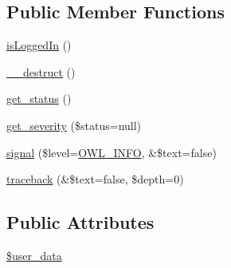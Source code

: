 \subsection*{Public Member Functions}
\begin{DoxyCompactItemize}
\item 
\hyperlink{classUserHandler_a4539c12ed2ce12a9147d61496854d5ab}{isLoggedIn} ()
\item 
\hyperlink{classUserHandler_a3e1f6381ed79caf6e1a255fb0a9cc386}{\_\-\_\-destruct} ()
\item 
\hyperlink{class__OWL_a99ec771fa2c5c279f80152cc09e489a8}{get\_\-status} ()
\item 
\hyperlink{class__OWL_adf9509ef96858be7bdd9414c5ef129aa}{get\_\-severity} (\$status=null)
\item 
\hyperlink{class__OWL_a51ba4a16409acf2a2f61f286939091a5}{signal} (\$level=\hyperlink{owl_8severitycodes_8php_a139328861128689f2f4def6a399d9057}{OWL\_\-INFO}, \&\$text=false)
\item 
\hyperlink{class__OWL_aa29547995d6741b7d2b90c1d4ea99a13}{traceback} (\&\$text=false, \$depth=0)
\end{DoxyCompactItemize}
\subsection*{Public Attributes}
\begin{DoxyCompactItemize}
\item 
\hyperlink{classUserHandler_ae7a2d59eee65560ac96b860e828bb445}{\$user\_\-data}
\end{DoxyCompactItemize}
